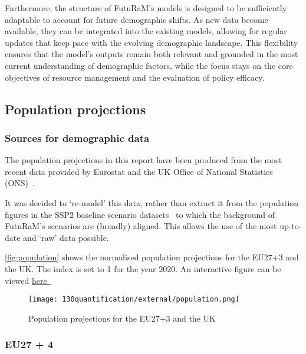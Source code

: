 Furthermore, the structure of FutuRaM's models is designed to be sufficiently
adaptable to account for future demographic shifts. As new data become
available, they can be integrated into the existing models, allowing for
regular updates that keep pace with the evolving demographic landscape. This
flexibility ensures that the model's outputs remain both relevant and grounded
in the most current understanding of demographic factors, while the focus stays
on the core objectives of resource management and the evaluation of policy
efficacy.



\subsection*{Population projections}

\subsubsection{Sources for demographic data}

The population projections in this report have been produced from the most
recent data provided by Eurostat and the UK Office of National Statistics
(ONS)~\cite{eurostat2023population, ons2023population, vanella2020populationprojections}.

It was decided to `re-model' this data, rather than extract it from the
population figures in the SSP2 baseline scenario
datasets~\cite{ssp2017narrative, samir2017ssp} to which the background of
FutuRaM's scenarios are (broadly) aligned. This allows the use of the most
up-to-date and `raw' data possible.

\autoref{fig:population} shows the normalised population projections for the EU27+3 and the UK. The index is set to 1 for the year 2020.
An interactive figure can be viewed \href{https://futuram-project.github.io/FutuRaM.github.io/WP2/assets.html}{here~\faLink}


\begin{figure}[h!]
      \centering
      \texttt{[image: 130quantification/external/population.png]}
      \caption{Population projections for the EU27+3 and the UK}\label{fig:population} 
\end{figure}

\subsubsection{EU27 + 4}

